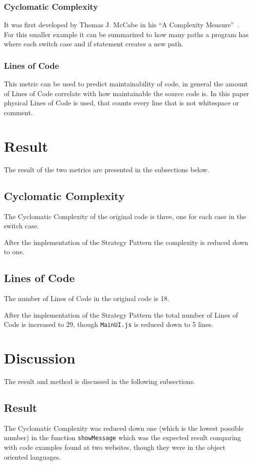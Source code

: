 \documentclass[conference, a4paper]{IEEEtran}
\begin{document}
\subsubsection{Cyclomatic Complexity}
It was first developed by Thomas J. McCabe in his ``A Complexity Measure''~\cite{bibitem:CC}. For this smaller example it can be summarized to how many paths a program has where each switch case and if statement creates a new path.

\subsubsection{Lines of Code}
This metric can be used to predict maintainability of code, in general the amount of Lines of Code correlate with how maintainable the source code is. In this paper physical Lines of Code is used, that counts every line that is not whitespace or comment.

\section{Result}
The result of the two metrics are presented in the subsections below.

\subsection{Cyclomatic Complexity}
The Cyclomatic Complexity of the original code is three, one for each case in the switch case.

After the implementation of the Strategy Pattern the complexity is reduced down to one.

\subsection{Lines of Code}
The number of Lines of Code in the original code is 18.

After the implementation of the Strategy Pattern the total number of Lines of Code is increased to 29, though \texttt{MainUI.js} is reduced down to 5 lines.

\section{Discussion}
The result and method is discussed in the following subsections.

\subsection{Result}
The Cyclomatic Complexity was reduced down one (which is the lowest possible number) in the function \texttt{showMessage} which was the expected result comparing with code examples found at two websites, though they were in the object oriented languages.
\end{document}
